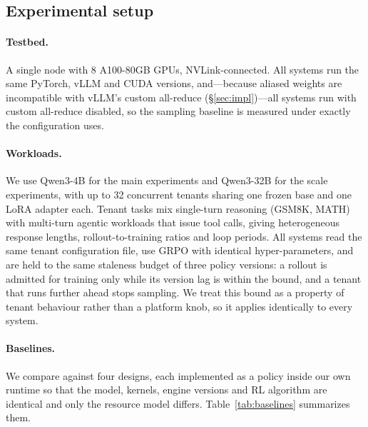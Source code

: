 \subsection{Experimental setup}

\paragraph{Testbed.} A single node with 8 A100-80GB GPUs, NVLink-connected. All systems
run the same PyTorch, vLLM and CUDA versions, and---because aliased weights are
incompatible with vLLM's custom all-reduce (\S\ref{sec:impl})---all systems run with
custom all-reduce disabled, so the sampling baseline is measured under exactly the
configuration \sysname uses.

\paragraph{Workloads.} We use Qwen3-4B for the main experiments and Qwen3-32B for the
scale experiments, with up to 32 concurrent tenants sharing one frozen base and one LoRA
adapter each. Tenant tasks mix single-turn reasoning (GSM8K, MATH) with multi-turn
agentic workloads that issue tool calls, giving heterogeneous response lengths,
rollout-to-training ratios and loop periods. All systems read the same tenant
configuration file, use GRPO with identical hyper-parameters, and are held to the same
staleness budget of three policy versions: a rollout is admitted for training only while
its version lag is within the bound, and a tenant that runs further ahead stops
sampling. We treat this bound as a property of tenant behaviour rather than a platform
knob, so it applies identically to every system.

\paragraph{Baselines.} We compare against four designs, each implemented as a policy
inside our own runtime so that the model, kernels, engine versions and RL algorithm are
identical and only the resource model differs. Table~\ref{tab:baselines} summarizes them.

